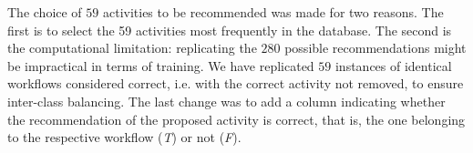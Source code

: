 \documentclass[10pt,letterpaper]{article}
\begin{document}
The choice of \(59\) activities to be recommended was made for two reasons. The first is to select the 59 activities most frequently in the database. The second is the computational limitation: replicating the \(280\) possible recommendations might be impractical in terms of training. We have replicated \(59\) instances of identical workflows considered correct, i.e. with the correct activity not removed, to ensure inter-class balancing. The last change was to add a column indicating whether the recommendation of the proposed activity is correct, that is, the one belonging to the respective workflow (\emph{T}) or not (\emph{F}).
\end{document}
